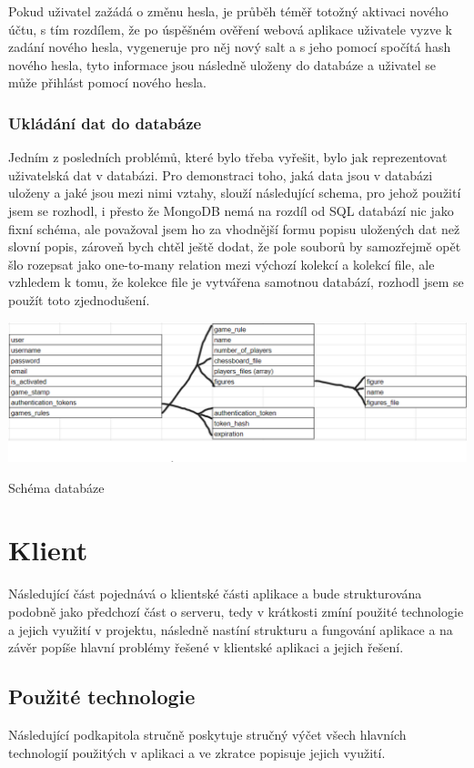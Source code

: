 \documentclass[12pt]{article}
\begin{document}
Pokud uživatel zažádá o změnu hesla, je průběh téměř totožný aktivaci nového účtu, s tím rozdílem, že po úspěšném ověření webová aplikace uživatele vyzve k zadání nového hesla, vygeneruje pro něj nový salt a s jeho pomocí spočítá hash nového hesla, tyto informace jsou následně uloženy do databáze a uživatel se může přihlást pomocí nového hesla. 

\subsubsection{Ukládání dat do databáze}
Jedním z posledních problémů, které bylo třeba vyřešit, bylo jak reprezentovat uživatelská dat v databázi. Pro demonstraci toho, jaká data jsou v databázi uloženy a jaké jsou mezi nimi vztahy, slouží následující schema, pro jehož použití jsem se rozhodl, i přesto že MongoDB nemá na rozdíl od SQL databází nic jako fixní schéma, ale považoval jsem ho za vhodnější formu popisu uložených dat než slovní popis, zároveň bych chtěl ještě dodat, že pole souborů by samozřejmě opět šlo rozepsat jako one-to-many relation mezi výchozí kolekcí a kolekcí file, ale vzhledem k tomu, že kolekce file je vytvářena samotnou databází, rozhodl jsem se použít toto zjednodušení.
\begin{listing}[!ht]
\includegraphics[scale=0.75, width=15cm]{pictures/schem.png}\par
\caption{Schéma databáze}
\end{listing}
\newpage
\section{Klient}
Následující část pojednává o klientské části aplikace a bude strukturována podobně jako předchozí část o serveru, tedy v krátkosti zmíní použité technologie a jejich využití v projektu, následně nastíní strukturu a fungování aplikace a na závěr popíše hlavní problémy řešené v klientské aplikaci a jejich řešení.
\subsection{Použité technologie}
Následující podkapitola stručně poskytuje stručný výčet všech hlavních technologií použitých v aplikaci a ve zkratce popisuje jejich využití.
\end{document}
